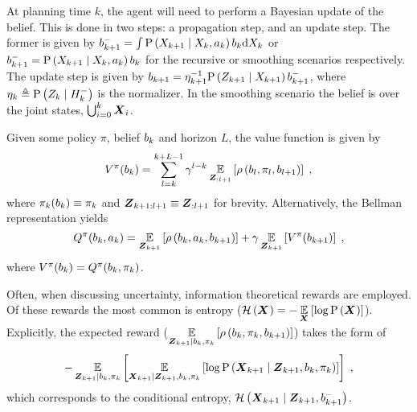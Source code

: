 At planning time $k$, the agent will need to perform a Bayesian update of the belief. This is done in two steps: a propagation step, and an update step. The former is given by	$\priorB{k+1}=\int\probcond{\states{k+1}}{\states{k},\action{k}}\blf{k}\D\states{k}$ or	$\priorB{k+1}=\probcond{\states{k+1}}{\states{k},\action{k}}\blf{k}$ for the recursive or smoothing scenarios respectively. The update step is given by $\blf{k+1}=\normalizer{k+1}^{-1}\probcond{\observations{k+1}}{\states{k+1}}\priorB{k+1}$, where $\normalizer{k}\triangleq\probcond{\observations{k}}{\priorHist{k}}$ is the normalizer. In the smoothing scenario the belief is over the joint states, $\bigcup_{i=0}^k\statesRV{i}$.

Given some policy $\pi$, belief $\blf{k}$ and horizon $L$, the value function is given by
\begin{equation}
	V^\pi(\blf{k})=\sum_{l=k}^{k+L-1}\gamma^{l-k}\expectation{\reward{\blf{l},\pi_l,\blf{l+1}}}{\observationsRV{:l+1}}\;,\label{eq:value_function}
\end{equation}
where $\pi_k(\blf{k})\equiv \pi_k$ and $\observationsRV{k+1:l+1}\equiv \observationsRV{:l+1}$ for brevity. Alternatively, the Bellman representation yields
\begin{equation}
	Q^\pi(\blf{k},\action{k})=\expectation{\reward{\blf{k},\action{k},\blf{k+1}}}{\observationsRV{k+1}}+\gamma\expectation{V^\pi(\blf{k+1})}{\observationsRV{k+1}}\;,\label{eq:bellman}
\end{equation}
where $V^\pi(\blf{k})=Q^\pi(\blf{k},\pi_k)$.

Often, when discussing uncertainty, information theoretical rewards are employed. Of these rewards the most common is entropy ($\entropy{\statesRV{}}=-\expectation{\log\prob{\statesRV{}}}{\statesRV{}}$). Explicitly, the expected reward ($\expectation{\reward{\blf{k},\pi_k,\blf{k+1}}}{\observationsRV{k+1}\mid\blf{k},\pi_k}$) takes the form of
\[-\expectation{\expectation{\log\probcond{\statesRV{k+1}}{\observationsRV{k+1},\blf{k},\pi_k}}{\statesRV{k+1}\mid\observationsRV{k+1},\blf{k},\pi_k}}{\observationsRV{k+1}\mid\blf{k},\pi_k}\;,\] which corresponds to the conditional entropy, $\condEntropy{\statesRV{k+1}}{\observationsRV{k+1},\priorB{k+1}}$.

